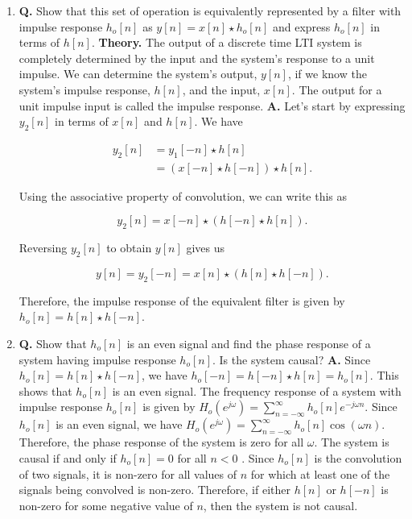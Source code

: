 \documentclass[main.tex]{subfiles}
\begin{document}
\begin{enumerate}
    \begin{enumerate}
        \item \textbf{Q.} Show that this set of operation is equivalently represented by a filter with impulse response $h_{o}[n]$ as $y[n]=x[n] \star h_{o}[n]$ and express $h_{o}[n]$ in terms of $h[n]$. \textbf{Theory.} The output of a discrete time LTI system is completely determined by the input and the system's response to a unit impulse. We can determine the system's output, $y[n]$, if we know the system's impulse response, $h[n]$, and the input, $x[n]$. The output for a unit impulse input is called the impulse response. \textbf{A.} Let's start by expressing $y_2[n]$ in terms of $x[n]$ and $h[n]$. We have
        
        $$
        \begin{aligned}
        y_2[n]&=y_1[-n] \star h[n] \\
        &=(x[-n] \star h[-n]) \star h[n] .
        \end{aligned}
        $$
        
        Using the associative property of convolution, we can write this as 
        
        $$
        y_2[n]=x[-n] \star(h[-n] \star h[n]).
        $$
        
        Reversing $y_2[n]$ to obtain $y[n]$ gives us 
        
        $$
        y[n]=y_2[-n]=x[n] \star(h[n] \star h[-n]).
        $$
        
        Therefore, the impulse response of the equivalent filter is given by $h_o[n]=h[n] \star h[-n]$.
        
        \item \textbf{Q.} Show that $h_{o}[n]$ is an even signal and find the phase response of a system having impulse response $h_{o}[n]$. Is the system causal? \textbf{A.} Since $h_o[n]=h[n] \star h[-n]$, we have $h_o[-n]=h[-n] \star h[n]=h_o[n]$. This shows that $h_o[n]$ is an even signal. The frequency response of a system with impulse response $h_o[n]$ is given by $H_o\left(e^{j \omega}\right)=\sum_{n=-\infty}^{\infty} h_o[n] e^{-j \omega n}$. Since $h_o[n]$ is an even signal, we have $H_o\left(e^{j \omega}\right)=\sum_{n=-\infty}^{\infty} h_o[n] \cos (\omega n)$. Therefore, the phase response of the system is zero for all $\omega$. The system is causal if and only if $h_o[n]=0$ for all $n<0$ . Since $h_o[n]$ is the convolution of two signals, it is non-zero for all values of $n$ for which at least one of the signals being convolved is non-zero. Therefore, if either $h[n]$ or $h[-n]$ is non-zero for some negative value of $n$, then the system is not causal.
        

\end{enumerate}
\end{enumerate}
\end{document}
